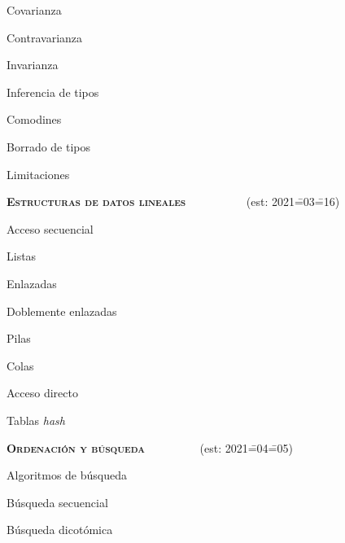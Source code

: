 \begin{longenum}
\begin{longenum}
\begin{longenum}
            \begin{longenum}
                \item Covarianza
                \item Contravarianza
                \item Invarianza
            \end{longenum}
        \end{longenum}
        \item Inferencia de tipos
        \item Comodines
        \item Borrado de tipos
        \item Limitaciones
    \end{longenum}
    \item \textbf{\textsc{Estructuras de datos lineales}} \ \ \ \ \ \ \ \ \ \ (est: 2021\==03\==16)
    \begin{longenum}
        \item Acceso secuencial
        \begin{longenum}
            \item Listas
            \begin{longenum}
                \item Enlazadas
                \item Doblemente enlazadas
            \end{longenum}
            \item Pilas
            \item Colas
        \end{longenum}
        \item Acceso directo
        \begin{longenum}
            \item Tablas \textit{hash}
        \end{longenum}
    \end{longenum}
    \item \textbf{\textsc{Ordenación y búsqueda}} \ \ \ \ \ \ \ \ \ (est: 2021\==04\==05)
    \begin{longenum}
        \item Algoritmos de búsqueda
        \begin{longenum}
            \item Búsqueda secuencial
            \item Búsqueda dicotómica
        \end{longenum}

\end{longenum}
\end{longenum}
